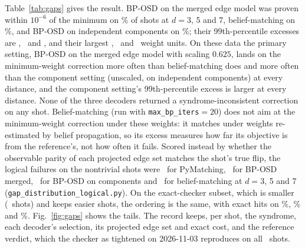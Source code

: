 \documentclass[aps,pra,twocolumn,superscriptaddress,nofootinbib,longbibliography,floatfix]{revtex4-2}
\begin{document}
Table~\ref{tab:gaps} gives the result. BP-OSD on the merged edge model was proven within $10^{-6}$ of the minimum on \GapMergedEpsOptPct\% of shots at $d=3$, 5 and 7, belief-matching on \GapBmEpsOptPct\%, and BP-OSD on independent components on \GapComponentEpsOptPct\%; their 99th-percentile excesses are \GapMergedPNinetyNine, \GapBmPNinetyNine\ and \GapComponentPNinetyNine, and their largest \GapMergedMax, \GapBmMax\ and \GapComponentMax\ weight units. On these data the primary setting, BP-OSD on the merged edge model with scaling $0.625$, lands on the minimum-weight correction more often than belief-matching does and more often than the component setting (unscaled, on independent components) at every distance, and the component setting's 99th-percentile excess is larger at every distance. None of the three decoders returned a syndrome-inconsistent correction on any shot. Belief-matching (run with \texttt{max\_bp\_iters}${}=20$) does not aim at the minimum-weight correction under these weights: it matches under weights re-estimated by belief propagation, so its excess measures how far its objective is from the reference's, not how often it fails. Scored instead by whether the observable parity of each projected edge set matches the shot's true flip, the logical failures on the nontrivial shots were \GapLogicalPm\ for PyMatching, \GapLogicalMerged\ for BP-OSD merged, \GapLogicalComponent\ for BP-OSD on components and \GapLogicalBm\ for belief-matching at $d=3$, 5 and 7 (\nolinkurl{gap_distribution_logical.py}). On the exact-checker subset, which is smaller (\GapExactRef\ shots) and keeps easier shots, the ordering is the same, with exact hits on \GapMergedExactSubsetHitPct\%, \GapBmExactSubsetHitPct\% and \GapComponentExactSubsetHitPct\%. Fig.~\ref{fig:gaps} shows the tails. The record keeps, per shot, the syndrome, each decoder's selection, its projected edge set and exact cost, and the reference verdict, which the checker as tightened on 2026-11-03 reproduces on all \GapRejudged\ shots.
\end{document}
